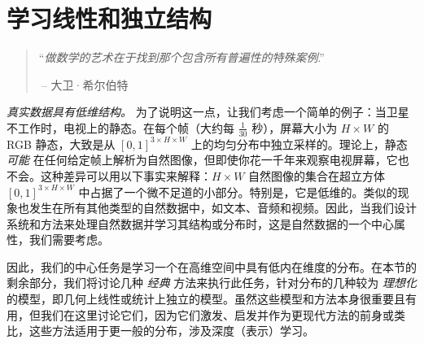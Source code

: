 \documentclass[../../book-main_zh.tex]{subfiles}
\begin{document}
\chapter{学习线性和独立结构}
\label{ch:classic}\label{ch:linear-independent}

\begin{quote}
\hfill  ``{\em 做数学的艺术在于找到那个包含所有普遍性的特殊案例}.''

$~$\hfill -- 大卫·希尔伯特
\end{quote}
\vspace{5mm}






\textit{真实数据具有低维结构。} 为了说明这一点，让我们考虑一个简单的例子：当卫星不工作时，电视上的静态。在每个帧（大约每 \(\frac{1}{30}\) 秒），屏幕大小为 \(H \times W\) 的 RGB 静态，大致是从 \([0, 1]^{3 \times H \times W}\) 上的均匀分布中独立采样的。理论上，静态 \textit{可能} 在任何给定帧上解析为自然图像，但即使你花一千年来观察电视屏幕，它也不会。这种差异可以用以下事实来解释：\(H \times W\) 自然图像的集合在超立方体 \([0, 1]^{3 \times H \times W}\) 中占据了一个微不足道的小部分。特别是，它是低维的。类似的现象也发生在所有其他类型的自然数据中，如文本、音频和视频。因此，当我们设计系统和方法来处理自然数据并学习其结构或分布时，这是自然数据的一个中心属性，我们需要考虑。 %

因此，我们的中心任务是学习一个在高维空间中具有低内在维度的分布。在本节的剩余部分，我们将讨论几种 \textit{经典} 方法来执行此任务，针对分布的几种较为 {\em 理想化} 的模型，即几何上线性或统计上独立的模型。虽然这些模型和方法本身很重要且有用，但我们在这里讨论它们，因为它们激发、启发并作为更现代方法的前身或类比，这些方法适用于更一般的分布，涉及深度（表示）学习。
\end{document}
